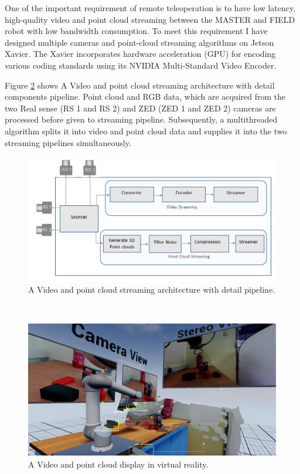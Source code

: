 One of the important requirement of remote teleoperation is to have low latency, high-quality video and point cloud streaming between the MASTER and FIELD robot with low bandwidth consumption. To meet this requirement I have designed multiple cameras and point-cloud streaming algorithms on Jetson Xavier. The Xavier incorporates hardware acceleration (GPU) for encoding various coding standards using its NVIDIA Multi-Standard Video Encoder.

Figure \ref{fig:StreamingPipe} shows A Video and point cloud streaming architecture with detail components pipeline. Point cloud and RGB data, which are acquired from the two Real sense (RS 1 and RS 2) and ZED (ZED 1 and ZED 2) cameras are processed before given to streaming pipeline. Subsequently, a multithreaded algorithm splits it into video and point cloud data and supplies it into the two streaming pipelines simultaneously. 

\begin{figure}[h]
    \centering
    \includegraphics[scale=0.5]{images/Video_Point_Streaming.PNG}
    \caption{A Video and point cloud streaming architecture with detail pipeline.}
    \label{fig:StreamingPipe}
\end{figure}\\


\begin{figure}[h]
    \centering
    \includegraphics[scale=0.3]{images/Point_cloud_multipl_1.PNG}
    \caption{A Video and point cloud display in virtual reality.}
    \label{fig:StreamingPipe}
\end{figure}\\



